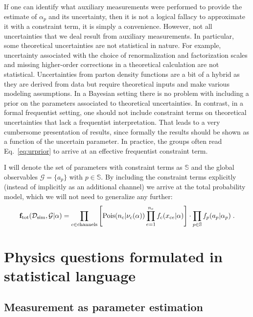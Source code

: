 \documentclass{cernrep}
\newcommand{\Pois}{{\ensuremath{\rm Pois}}}
\newcommand{\datasim}{{\ensuremath{\mathcal{D}_{\textrm{sim}}}}}
\newcommand{\F}{{\ensuremath{\mathbf{f}}}}
\begin{document}
If one can identify what auxiliary measurements were performed to provide the estimate of $\alpha_p$ and its uncertainty, then it is not a logical fallacy to approximate it with a constraint term, it is simply  a convenience.  However, not all uncertainties that we deal result from auxiliary measurements.  In particular, some theoretical uncertainties are not statistical in nature.  For example, uncertainty associated with the choice of renormalization and factorization scales and missing higher-order corrections in a theoretical calculation are not statistical.  Uncertainties from parton density functions are a bit of a hybrid as they are derived from data but require theoretical inputs and make various modeling assumptions.  In a Bayesian setting there is no problem with including a prior on the parameters associated to theoretical uncertainties.  In contrast, in a formal frequentist setting, one should not include constraint terms on theoretical uncertainties that lack a frequentist interpretation.  That leads to a very cumbersome presentation of results, since formally the results should be shown as a function of the uncertain parameter.  In practice, the groups often read Eq.~\ref{eq:urprior} to arrive at an effective frequentist constraint term.

I will denote the set of parameters with constraint terms as $\mathbb{S}$ and the global observables $\mathcal{G}=\{a_p\}$ with $p\in\mathbb{S}$.  By including the constraint terms explicitly (instead of implicitly as an additional channel) we arrive at the total probability model, which we will not need to generalize any further:
\begin{equation}
\label{Eq:ftot}
\F_{\textrm{tot}}(\datasim, \mathcal{G}|\alpha) = \prod_{c\in\rm channels} \left[ \Pois(n_c|\nu_c(\alpha)) \prod_{e=1}^{n_c} f_c(x_{ce}|\alpha) \right] \cdot \prod_{p \in \mathbb{S}} f_p(a_p | \alpha_p)\; .
\end{equation}

\section{Physics questions formulated in statistical language}

\subsection{Measurement as parameter estimation}
\label{S:estimation}
\end{document}
